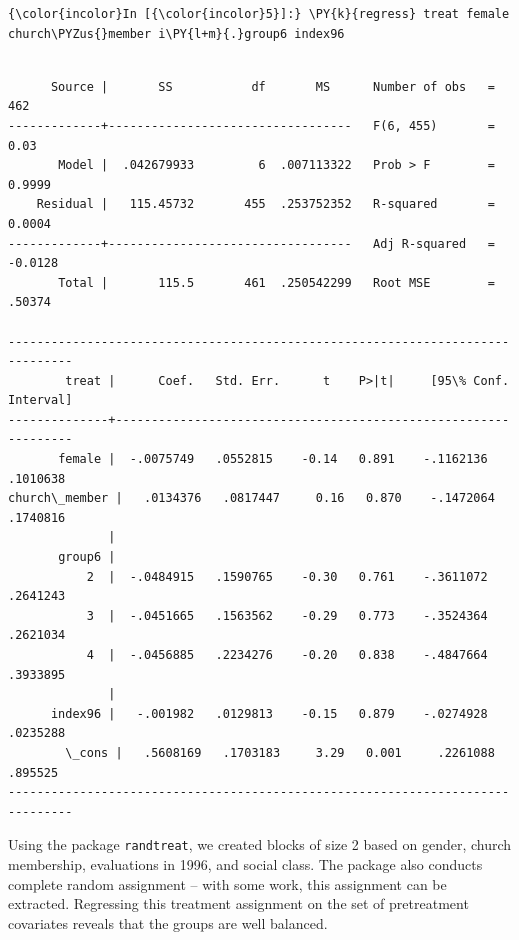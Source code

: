 \documentclass[11pt,notitlepage]{article}\usepackage[]{graphicx}\usepackage[]{color}
\makeatletter
\newenvironment{kframe}{%
 \def\at@end@of@kframe{}%
 \ifinner\ifhmode%
  \def\at@end@of@kframe{\end{minipage}}%
  \begin{minipage}{\columnwidth}%
 \fi\fi%
 \def\FrameCommand##1{\hskip\@totalleftmargin \hskip-\fboxsep
 \colorbox{shadecolor}{##1}\hskip-\fboxsep
     \hskip-\linewidth \hskip-\@totalleftmargin \hskip\columnwidth}%
 \MakeFramed {\advance\hsize-\width
   \@totalleftmargin\z@ \linewidth\hsize
   \@setminipage}}%
 {\par\unskip\endMakeFramed%
 \at@end@of@kframe}
\newenvironment{knitrout}{}{} %
\makeatother
\begin{document}
\begin{enumerate}[a)]
\begin{knitrout}
\begin{kframe}
    \begin{Verbatim}[commandchars=\\\{\}]
{\color{incolor}In [{\color{incolor}5}]:} \PY{k}{regress} treat female church\PYZus{}member i\PY{l+m}{.}group6 index96
\end{Verbatim}

    \begin{Verbatim}[commandchars=\\\{\}]

      Source |       SS           df       MS      Number of obs   =       462
-------------+----------------------------------   F(6, 455)       =      0.03
       Model |  .042679933         6  .007113322   Prob > F        =    0.9999
    Residual |   115.45732       455  .253752352   R-squared       =    0.0004
-------------+----------------------------------   Adj R-squared   =   -0.0128
       Total |       115.5       461  .250542299   Root MSE        =    .50374

-------------------------------------------------------------------------------
        treat |      Coef.   Std. Err.      t    P>|t|     [95\% Conf. Interval]
--------------+----------------------------------------------------------------
       female |  -.0075749   .0552815    -0.14   0.891    -.1162136    .1010638
church\_member |   .0134376   .0817447     0.16   0.870    -.1472064    .1740816
              |
       group6 |
           2  |  -.0484915   .1590765    -0.30   0.761    -.3611072    .2641243
           3  |  -.0451665   .1563562    -0.29   0.773    -.3524364    .2621034
           4  |  -.0456885   .2234276    -0.20   0.838    -.4847664    .3933895
              |
      index96 |   -.001982   .0129813    -0.15   0.879    -.0274928    .0235288
        \_cons |   .5608169   .1703183     3.29   0.001     .2261088     .895525
-------------------------------------------------------------------------------

    \end{Verbatim}
\end{kframe}
\end{knitrout}

Using the package \texttt{randtreat}, we created blocks of size 2 based on gender, church membership, evaluations in 1996, and social class. The package also conducts complete random assignment -- with some work, this assignment can be extracted. Regressing this treatment assignment on the set of pretreatment covariates reveals that the groups are well balanced.


\end{enumerate}
\end{document}
